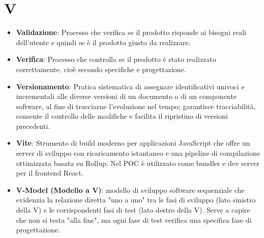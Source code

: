 \documentclass[11pt,a4paper]{article}
\begin{document}
\newpage

\section*{V}
\begin{itemize}
\item \textbf{Validazione}: Processo che verifica se il prodotto risponde ai bisogni reali dell’utente e quindi se è il prodotto giusto da realizzare.

\item \textbf{Verifica}: Processo che controlla se il prodotto è stato realizzato correttamente, cioè secondo specifiche e progettazione.

\item \textbf{Versionamento}: Pratica sistematica di assegnare identificativi univoci e incrementali alle diverse versioni di un documento o di un componente software, al fine di tracciarne l'evoluzione nel tempo; garantisce tracciabilità, consente il controllo delle modifiche e facilita il ripristino di versioni precedenti.

\item \textbf{Vite}: Strumento di build moderno per applicazioni 
JavaScript che offre un server di sviluppo con ricaricamento 
istantaneo e una pipeline di compilazione ottimizzata basata 
su Rollup. Nel POC è utilizzato come bundler e dev server per 
il frontend React.

\item \textbf{V-Model (Modello a V)}: modello di sviluppo software sequenziale che evidenzia la relazione diretta "uno a uno" tra le fasi di sviluppo (lato sinistro della V) e le corrispondenti fasi di test (lato destro della V). Serve a capire che non si testa "alla fine", ma ogni fase di test verifica una specifica fase di progettazione.


\end{itemize}

\newpage
\end{document}
